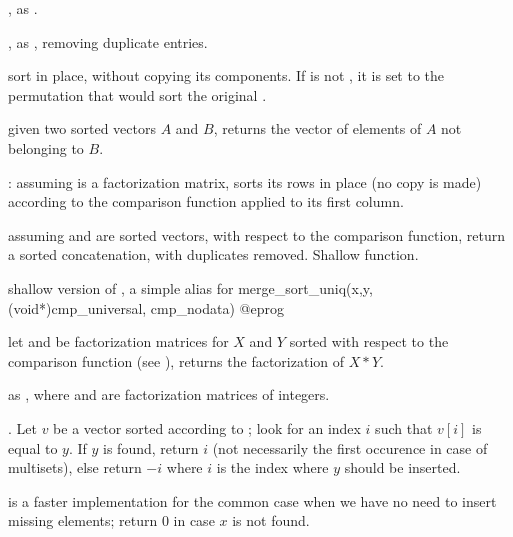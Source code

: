 ,
as .

,
as , removing duplicate entries.

 sort  in place, without copying its components. If
 is not , it is set to the permutation that would sort
the original .

 given two sorted
vectors $A$ and $B$, returns the vector of elements of $A$ not belonging to
$B$.

:
assuming  is a factorization matrix, sorts its rows in place (no copy
is made) according to the comparison function  applied to its first
column.

assuming  and  are sorted vectors, with respect to the 
comparison function, return a sorted concatenation, with duplicates removed.
Shallow function.

 shallow version of , a
simple alias for
\bprog
  merge_sort_uniq(x,y, (void*)cmp_universal, cmp_nodata)
@eprog

let  and  be factorization matrices for $X$ and $Y$
sorted with respect to the comparison function  (see
), returns the factorization of $X * Y$.

as , where  and  are factorization matrices of
integers.

.\hfil\break
Let $v$ be a vector sorted according to ; look for an
index $i$ such that  $v[i]$ is equal to $y$. If $y$ is found, return $i$
(not necessarily the first occurence in case of multisets), else return $-i$
where $i$ is the index where $y$ should be inserted.

 is a faster
implementation for the common case 
when we have no need to insert missing elements; return $0$ in case $x$
is not found.

